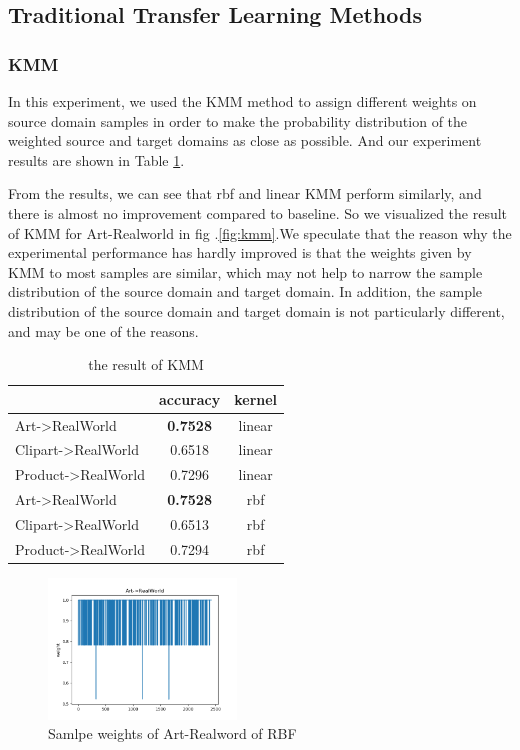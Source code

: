 \documentclass[conference]{IEEEtran}
\begin{document}
\subsection{Traditional Transfer Learning Methods}
\subsubsection{KMM}
In this experiment, we used the KMM method to assign different weights on source domain samples in order to make the probability distribution of the weighted source and target domains as close as possible. And our experiment results are shown in Table \ref{tab:kmm}.\par
From the results, we can see that rbf and linear KMM perform similarly, and there is almost no improvement compared to baseline. So we visualized the result of KMM for Art-Realworld in fig .\ref{fig:kmm}.We speculate that the reason why the experimental performance has hardly improved is that the weights given by KMM to most samples are similar, which may not help to narrow the sample distribution of the source domain and target domain. In addition, the sample distribution of the source domain and target domain is not particularly different, and may be one of the reasons.
\begin{table}[H]
	\centering
	\caption{the result of KMM}
	\begin{tabular}{|l|c|c|}
		\hline
		\diagbox{dataset}{result} & accuracy  & kernel \\
		\hline
		Art->RealWorld & \textbf{0.7528} & linear \\
		\hline
		Clipart->RealWorld & 0.6518 & linear \\
		\hline
		Product->RealWorld & 0.7296 & linear \\
		\hline
		Art->RealWorld & \textbf{0.7528}  & rbf \\
		\hline
		Clipart->RealWorld & 0.6513 & rbf \\
		\hline
		Product->RealWorld & 0.7294 & rbf \\
		\hline
	\end{tabular}\label{tab:kmm}
\end{table}

\begin{center}
	\begin{figure}[H]
		\centering
		\includegraphics[width=5cm]{img/A_R_weight_rbf.png}
		\caption{Samlpe weights of Art-Realword of RBF}
	\end{figure}\label{fig:kmm}
\end{center}
\end{document}
